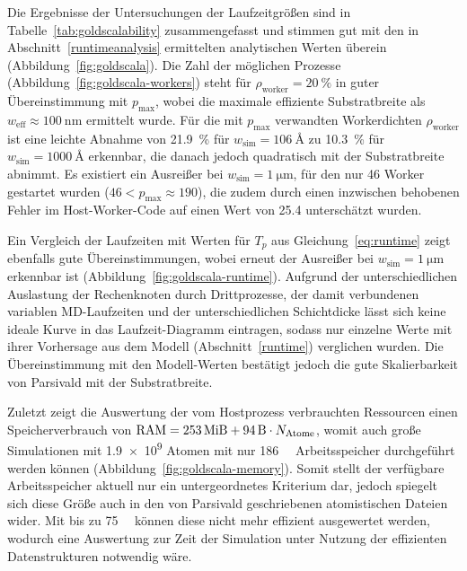 Die Ergebnisse der Untersuchungen der Laufzeitgrößen sind in Tabelle~\ref{tab:goldscalability} zusammengefasst und stimmen gut mit den in Abschnitt~\ref{runtimeanalysis} ermittelten analytischen Werten überein (Abbildung~\ref{fig:goldscala}).
Die Zahl der möglichen Prozesse (Abbildung~\ref{fig:goldscala-workers}) steht für $\rho_\text{worker}=\SI{20}{\percent}$ in guter Übereinstimmung mit $p_\text{max}$, wobei die maximale effiziente Substratbreite als $w_\text{eff} \approx \SI{100}{\nano\meter}$ ermittelt wurde.
Für die mit $p_\text{max}$ verwandten Workerdichten $\rho_\text{worker}$ ist eine leichte Abnahme von \SI{21.9}{\percent} für $w_\text{sim} = \SI{106}{\angstrom}$ zu \SI{10.3}{\percent} für $w_\text{sim} = \SI{1000}{\angstrom}$ erkennbar, die danach jedoch quadratisch mit der Substratbreite abnimmt.
Es existiert ein Ausreißer bei $w_\text{sim} = \SI{1}{\micro\meter}$, für den nur 46 Worker gestartet wurden ($\num{46} < p_\text{max} \approx \num{190}$), die zudem durch einen inzwischen behobenen Fehler im Host-Worker-Code auf einen Wert von \num{25.4} unterschätzt wurden.

Ein Vergleich der Laufzeiten mit Werten für $T_p$ aus Gleichung~\ref{eq:runtime} zeigt ebenfalls gute Übereinstimmungen, wobei erneut der Ausreißer bei $w_\text{sim} = \SI{1}{\micro\meter}$ erkennbar ist (Abbildung~\ref{fig:goldscala-runtime}). %
Aufgrund der unterschiedlichen Auslastung der Rechenknoten durch Drittprozesse, der damit verbundenen variablen MD-Laufzeiten und der unterschiedlichen Schichtdicke lässt sich keine ideale Kurve in das Laufzeit-Diagramm eintragen, sodass nur einzelne Werte mit ihrer Vorhersage aus dem Modell (Abschnitt~\ref{runtime}) verglichen wurden.
Die Übereinstimmung mit den Modell-Werten bestätigt jedoch die gute Skalierbarkeit von Parsivald mit der Substratbreite.

Zuletzt zeigt die Auswertung der vom Hostprozess verbrauchten Ressourcen einen Speicherverbrauch von $\text{RAM} = \SI{253}{\mebi\byte} + \SI{94}{\byte} \cdot N_\text{Atome}$, womit auch große Simulationen mit \num{1.9e9} Atomen mit nur \SI{186}{\gibi\byte} Arbeitsspeicher durchgeführt werden können (Abbildung~\ref{fig:goldscala-memory}).
Somit stellt der verfügbare Arbeitsspeicher aktuell nur ein untergeordnetes Kriterium dar, jedoch spiegelt sich diese Größe auch in den von Parsivald geschriebenen atomistischen Dateien wider.
Mit bis zu \SI{75}{\gibi\byte} können diese nicht mehr effizient ausgewertet werden, wodurch eine Auswertung zur Zeit der Simulation unter Nutzung der effizienten Datenstrukturen notwendig wäre.

